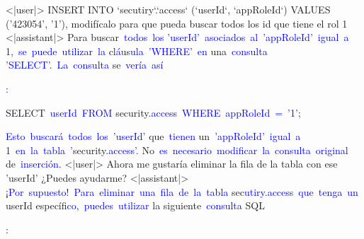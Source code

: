 \documentclass{article}
\begin{document}
\begin{tcolorbox}[colframe=black,colback=white]
<|user|>
INSERT INTO `secutiry`.`access` (`userId`, `appRoleId`) VALUES
('423054', '1'),  modifícalo para que pueda buscar todos los id que tiene el rol 1
<|assistant|>
Para buscar\textcolor{blue}{~todos}\textcolor{blue}{~los} '\textcolor{blue}{userId}\textcolor{blue}{'}\textcolor{blue}{~asoci}\textcolor{blue}{ados}\textcolor{blue}{~al}\textcolor{blue}{~'}\textcolor{blue}{app}\textcolor{blue}{RoleId}\textcolor{blue}{'}\textcolor{blue}{~igual}\textcolor{blue}{~a} \textcolor{blue}{1}\textcolor{blue}{,}\textcolor{blue}{~se}\textcolor{blue}{~puede}\textcolor{blue}{~utilizar}\textcolor{blue}{~la} cl\textcolor{blue}{á}us\textcolor{blue}{ula}\textcolor{blue}{~'}\textcolor{blue}{WHERE}\textcolor{blue}{'}\textcolor{blue}{~en} una\textcolor{blue}{~consulta} '\textcolor{blue}{SELECT}'.\textcolor{blue}{~La}\textcolor{blue}{~consulta} se\textcolor{blue}{~ver}\textcolor{blue}{ía}\textcolor{blue}{~así}\textcolor{blue}{:

}SELECT\textcolor{blue}{~userId}\textcolor{blue}{~FROM} security\textcolor{blue}{.access}\textcolor{blue}{~WHERE}\textcolor{blue}{~app}\textcolor{blue}{RoleId}\textcolor{blue}{~=}\textcolor{blue}{~'}\textcolor{blue}{1}';

\textcolor{blue}{Est}\textcolor{blue}{o}\textcolor{blue}{~buscar}\textcolor{blue}{á}\textcolor{blue}{~todos}\textcolor{blue}{~los}\textcolor{blue}{~'}\textcolor{blue}{userId}\textcolor{blue}{'} que\textcolor{blue}{~tienen} un\textcolor{blue}{~'}\textcolor{blue}{app}\textcolor{blue}{RoleId}\textcolor{blue}{'}\textcolor{blue}{~igual}\textcolor{blue}{~a} \textcolor{blue}{1}\textcolor{blue}{~en}\textcolor{blue}{~la}\textcolor{blue}{~tabla}\textcolor{blue}{~'}security\textcolor{blue}{.access}\textcolor{blue}{'.} No\textcolor{blue}{~es}\textcolor{blue}{~necesario}\textcolor{blue}{~modificar}\textcolor{blue}{~la}\textcolor{blue}{~consulta}\textcolor{blue}{~original} de\textcolor{blue}{~inser}\textcolor{blue}{ción}\textcolor{blue}{.}\textcolor{blue}{}\textcolor{blue}{
}<|user|>
Ahora me gustaría eliminar la fila de la tabla con ese 'userId' ¿Puedes ayudarme?
<|assistant|>
¡\textcolor{blue}{Por}\textcolor{blue}{~sup}\textcolor{blue}{uesto}\textcolor{blue}{!}\textcolor{blue}{~Para}\textcolor{blue}{~eliminar}\textcolor{blue}{~una}\textcolor{blue}{~fila}\textcolor{blue}{~de}\textcolor{blue}{~la}\textcolor{blue}{~tabla} sec\textcolor{blue}{ut}\textcolor{blue}{iry}\textcolor{blue}{.access}\textcolor{blue}{~que}\textcolor{blue}{~tenga}\textcolor{blue}{~un} userId específ\textcolor{blue}{ico},\textcolor{blue}{~puedes}\textcolor{blue}{~utilizar} la siguiente\textcolor{blue}{~consulta} SQL\textcolor{blue}{:

}
\end{tcolorbox}
\end{document}
